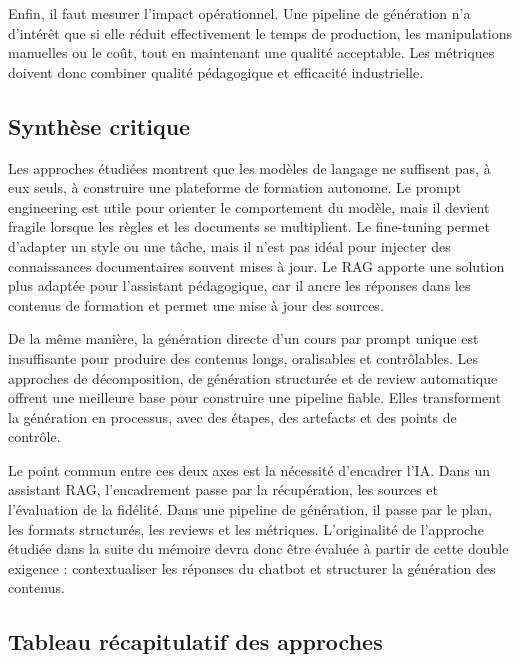 \documentclass[12pt,a4paper]{article}
\begin{document}
Enfin, il faut mesurer l'impact opérationnel. Une pipeline de génération n'a d'intérêt que
si elle réduit effectivement le temps de production, les manipulations manuelles ou le
coût, tout en maintenant une qualité acceptable. Les métriques doivent donc combiner
qualité pédagogique et efficacité industrielle.

\subsection{Synthèse critique}

Les approches étudiées montrent que les modèles de langage ne suffisent pas, à eux
seuls, à construire une plateforme de formation autonome. Le prompt engineering est
utile pour orienter le comportement du modèle, mais il devient fragile lorsque les règles
et les documents se multiplient. Le fine-tuning permet d'adapter un style ou une tâche,
mais il n'est pas idéal pour injecter des connaissances documentaires souvent mises à
jour. Le RAG apporte une solution plus adaptée pour l'assistant pédagogique, car il
ancre les réponses dans les contenus de formation et permet une mise à jour des sources.

De la même manière, la génération directe d'un cours par prompt unique est insuffisante
pour produire des contenus longs, oralisables et contrôlables. Les approches de
décomposition, de génération structurée et de review automatique offrent une meilleure
base pour construire une pipeline fiable. Elles transforment la génération en processus,
avec des étapes, des artefacts et des points de contrôle.

Le point commun entre ces deux axes est la nécessité d'encadrer l'IA. Dans un assistant
RAG, l'encadrement passe par la récupération, les sources et l'évaluation de la fidélité.
Dans une pipeline de génération, il passe par le plan, les formats structurés, les reviews
et les métriques. L'originalité de l'approche étudiée dans la suite du mémoire devra donc
être évaluée à partir de cette double exigence : contextualiser les réponses du chatbot et
structurer la génération des contenus.

\subsection{Tableau récapitulatif des approches}
\end{document}
